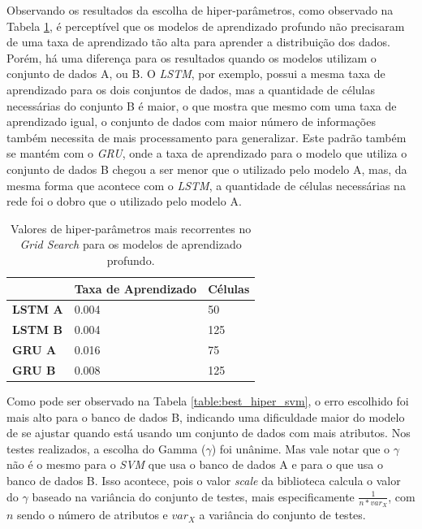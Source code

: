 Observando os resultados da escolha de hiper-parâmetros, como observado na Tabela \ref{table:best_hiper_deep}, é perceptível que os modelos de aprendizado profundo não precisaram de uma taxa de aprendizado tão alta para aprender a distribuição dos dados. Porém, há uma diferença para os resultados quando os modelos utilizam o conjunto de dados A, ou B. O \textit{\acrshort{LSTM}}, por exemplo, possui a mesma taxa de aprendizado para os dois conjuntos de dados, mas a quantidade de células necessárias do conjunto B é maior, o que mostra que mesmo com uma taxa de aprendizado igual, o conjunto de dados com maior número de informações também necessita de mais processamento para generalizar. Este padrão também se mantém com o \textit{\acrshort{GRU}}, onde a taxa de aprendizado para o modelo que utiliza o conjunto de dados B chegou a ser menor que o utilizado pelo modelo A, mas, da mesma forma que acontece com o \textit{\acrshort{LSTM}}, a quantidade de células necessárias na rede foi o dobro que o utilizado pelo modelo A.

\begin{table}[H]
    \begin{tabular*}{\linewidth}{@{\extracolsep{\fill}}lll}
    \toprule
     & 
    \multicolumn{1}{l}{\textbf{Taxa de Aprendizado}} & 
    \multicolumn{1}{l}{\textbf{Células}} 
    \\
\midrule
\textbf{LSTM A} & 0.004 & 50\\ \midrule
\textbf{LSTM B} & 0.004 & 125 \\ \midrule
\textbf{GRU A} & 0.016 &  75 \\ \midrule
\textbf{GRU B} & 0.008 &  125 \\
    \bottomrule
    \end{tabular*}
    \label{table:best_hiper_deep}
    \caption{Valores de hiper-parâmetros mais recorrentes no \textit{Grid Search} para os modelos de aprendizado profundo.}
\end{table}

Como pode ser observado na Tabela \ref{table:best_hiper_svm}, o erro escolhido foi mais alto para o banco de dados B, indicando uma dificuldade maior do modelo de se ajustar quando está usando um conjunto de dados com mais atributos. Nos testes realizados, a escolha do Gamma (\(\gamma\)) foi unânime. Mas vale notar que o \(\gamma\) não é o mesmo para o \textit{\acrshort{SVM}} que usa o banco de dados A e para o que usa o banco de dados B. Isso acontece, pois o valor \textit{scale} da biblioteca calcula o valor do \(\gamma\) baseado na variância do conjunto de testes, mais especificamente \(\frac{1}{n * var_X}\), com \(n\) sendo o número de atributos e \(var_X\) a variância do conjunto de testes.

